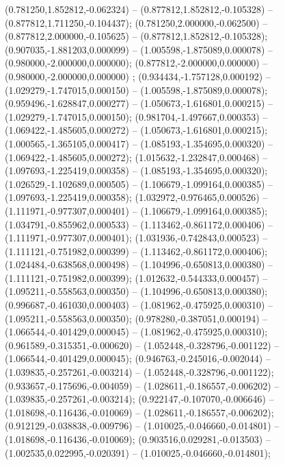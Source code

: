  (0.781250,1.852812,-0.062324) -- (0.877812,1.852812,-0.105328) -- (0.877812,1.711250,-0.104437);
 (0.781250,2.000000,-0.062500) -- (0.877812,2.000000,-0.105625) -- (0.877812,1.852812,-0.105328);
 (0.907035,-1.881203,0.000099) -- (1.005598,-1.875089,0.000078) -- (0.980000,-2.000000,0.000000);
 (0.877812,-2.000000,0.000000) -- (0.980000,-2.000000,0.000000) ;
 (0.934434,-1.757128,0.000192) -- (1.029279,-1.747015,0.000150) -- (1.005598,-1.875089,0.000078);
 (0.959496,-1.628847,0.000277) -- (1.050673,-1.616801,0.000215) -- (1.029279,-1.747015,0.000150);
 (0.981704,-1.497667,0.000353) -- (1.069422,-1.485605,0.000272) -- (1.050673,-1.616801,0.000215);
 (1.000565,-1.365105,0.000417) -- (1.085193,-1.354695,0.000320) -- (1.069422,-1.485605,0.000272);
 (1.015632,-1.232847,0.000468) -- (1.097693,-1.225419,0.000358) -- (1.085193,-1.354695,0.000320);
 (1.026529,-1.102689,0.000505) -- (1.106679,-1.099164,0.000385) -- (1.097693,-1.225419,0.000358);
 (1.032972,-0.976465,0.000526) -- (1.111971,-0.977307,0.000401) -- (1.106679,-1.099164,0.000385);
 (1.034791,-0.855962,0.000533) -- (1.113462,-0.861172,0.000406) -- (1.111971,-0.977307,0.000401);
 (1.031936,-0.742843,0.000523) -- (1.111121,-0.751982,0.000399) -- (1.113462,-0.861172,0.000406);
 (1.024484,-0.638568,0.000498) -- (1.104996,-0.650813,0.000380) -- (1.111121,-0.751982,0.000399);
 (1.012632,-0.544333,0.000457) -- (1.095211,-0.558563,0.000350) -- (1.104996,-0.650813,0.000380);
 (0.996687,-0.461030,0.000403) -- (1.081962,-0.475925,0.000310) -- (1.095211,-0.558563,0.000350);
 (0.978280,-0.387051,0.000194) -- (1.066544,-0.401429,0.000045) -- (1.081962,-0.475925,0.000310);
 (0.961589,-0.315351,-0.000620) -- (1.052448,-0.328796,-0.001122) -- (1.066544,-0.401429,0.000045);
 (0.946763,-0.245016,-0.002044) -- (1.039835,-0.257261,-0.003214) -- (1.052448,-0.328796,-0.001122);
 (0.933657,-0.175696,-0.004059) -- (1.028611,-0.186557,-0.006202) -- (1.039835,-0.257261,-0.003214);
 (0.922147,-0.107070,-0.006646) -- (1.018698,-0.116436,-0.010069) -- (1.028611,-0.186557,-0.006202);
 (0.912129,-0.038838,-0.009796) -- (1.010025,-0.046660,-0.014801) -- (1.018698,-0.116436,-0.010069);
 (0.903516,0.029281,-0.013503) -- (1.002535,0.022995,-0.020391) -- (1.010025,-0.046660,-0.014801);
